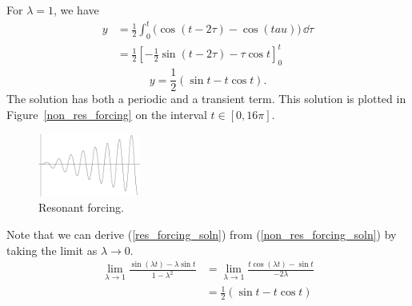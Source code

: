{\begin{Solution}
\begin{enumerate}
    For $\lambda = 1$, we have
    \begin{align*}
      y       &= \frac{1}{2} \int_0^t \big( \cos(t - 2 \tau) - \cos(tau) \big) \,\dd \tau\\
      &= \frac{1}{2} \left[ - \frac{1}{2} \sin( t - 2 \tau) - \tau \cos t
      \right]_0^t
    \end{align*}
    \begin{equation}
      \label{res_forcing_soln}
      \boxed{
        y = \frac{1}{2} \left( \sin t - t \cos t \right).
        }
    \end{equation}
    The solution has both a periodic and a transient term.
    This solution is plotted in Figure~\ref{non_res_forcing}
    on the interval $t \in [0,16 \pi]$.
    \begin{figure}[tb!]
      \begin{center}
        \includegraphics[width=0.3\textwidth]{ode/inhomogeneous/res_forcing}
      \end{center}
      \caption{Resonant forcing.}
      \label{res_forcing}
    \end{figure}

    Note that we can derive (\ref{res_forcing_soln}) from
    (\ref{non_res_forcing_soln}) by
    taking the limit as $\lambda \to 0$.
    \begin{align*}
      \lim_{\lambda \to 1} \frac{ \sin(\lambda t) - \lambda \sin t }{ 1 - \lambda^2 }
      &= \lim_{\lambda \to 1} \frac{ t \cos(\lambda t) - \sin t }
      {- 2 \lambda} \\
      &= \frac{1}{2} \left( \sin t - t \cos t \right)
    \end{align*}
  \end{enumerate}
\end{Solution}






}
